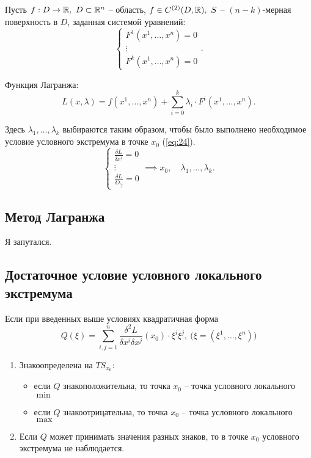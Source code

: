 \begin{note}
    Пусть $f:D\rightarrow\mathbb{R}, \ D \subset \mathbb{R}^n$ -- область, $f \in C^{(2)} (D,\mathbb{R}), \ S$ -- $(n-k)$-мерная поверхность в $D$, заданная системой уравнений:
    \[
        \left\{\begin{array}{l}
            F^1(x^1,\ldots,x^n) = 0 \\
            \vdots                  \\
            F^k(x^1,\ldots,x^n) = 0
        \end{array}\right..
    \]

    Функция Лагранжа:
    \[
        L(x,\lambda) = f(x^1,\ldots,x^n) + \sum_{i = 0}^{k}\lambda_i \cdot F^i(x^1,\ldots,x^n).
    \]

    Здесь $\lambda_1,\ldots,\lambda_k$ выбираются таким образом, чтобы было выполнено необходимое условие условного экстремума в точке $x_0$ (\ref{eq:24}).
    \[
        \left\{\begin{array}{l}
            \frac{\delta L}{\delta x^i} = 0 \\
            \vdots                          \\
            \frac{\delta L}{\delta \lambda_j} = 0
        \end{array}\right. \implies x_0,\quad \lambda_1,\ldots,\lambda_k.
    \]
\end{note}

\subsection{Метод Лагранжа}

Я запутался.

\subsection{Достаточное условие условного локального экстремума}

\begin{theorem}
    Если при введенных выше условиях квадратичная форма
    \[
        Q(\xi) = \sum_{i,j=1}^{n}\frac{\delta^2 L}{\delta x^i \delta x^j}(x_0)\cdot\xi^i\xi^j,\ \big(\xi=(\xi^1,\ldots,\xi^n)\big)
    \]
    \begin{enumerate}
        \item Знакоопределена на $TS_{x_0}$:
              \begin{itemize}
                  \item если $Q$ знакоположительна, то точка $x_0$ -- точка условного локального $\min$
                  \item если $Q$ знакоотрицательна, то точка $x_0$ -- точка условного локального $\max$
              \end{itemize}
        \item Если $Q$ может принимать значения разных знаков, то в точке $x_0$ условного экстремума не наблюдается.
    \end{enumerate}
\end{theorem}